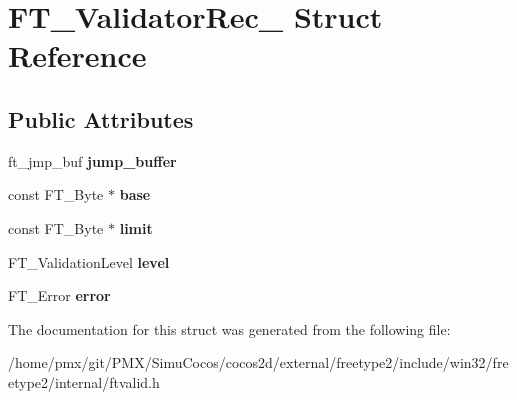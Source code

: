 \hypertarget{structFT__ValidatorRec__}{}\section{F\+T\+\_\+\+Validator\+Rec\+\_\+ Struct Reference}
\label{structFT__ValidatorRec__}
\subsection*{Public Attributes}
\begin{DoxyCompactItemize}
\item 
\mbox{\label{structFT__ValidatorRec___aa0b346f9ef78939e93c85389aa2b54b3}} 
ft\+\_\+jmp\+\_\+buf {\bfseries jump\+\_\+buffer}
\item 
\mbox{\label{structFT__ValidatorRec___adbd7e22453db2a6d393005ff9c39665f}} 
const F\+T\+\_\+\+Byte $\ast$ {\bfseries base}
\item 
\mbox{\label{structFT__ValidatorRec___aa29dfde776065fc32f901c0d6bb93d4f}} 
const F\+T\+\_\+\+Byte $\ast$ {\bfseries limit}
\item 
\mbox{\label{structFT__ValidatorRec___aa70830280c76507b8b06e616da8cb545}} 
F\+T\+\_\+\+Validation\+Level {\bfseries level}
\item 
\mbox{\label{structFT__ValidatorRec___ab12d54f54a55a90ce19761a1c24e28f0}} 
F\+T\+\_\+\+Error {\bfseries error}
\end{DoxyCompactItemize}


The documentation for this struct was generated from the following file\+:\begin{DoxyCompactItemize}
\item 
/home/pmx/git/\+P\+M\+X/\+Simu\+Cocos/cocos2d/external/freetype2/include/win32/freetype2/internal/ftvalid.\+h\end{DoxyCompactItemize}
